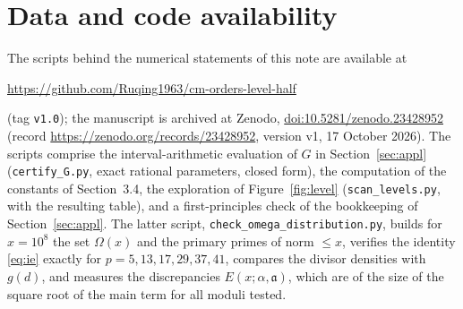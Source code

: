 \documentclass[11pt]{amsart}
\theoremstyle{remark}
\newcommand{\fa}{\mathfrak{a}}
\newcommand{\Om}{\Omega}
\begin{document}
\section*{Data and code availability}
The scripts behind the numerical statements of this note are available at
\begin{center}
\url{https://github.com/Ruqing1963/cm-orders-level-half}
\end{center}
(tag \texttt{v1.0}); the manuscript is archived at Zenodo, \href{https://doi.org/10.5281/zenodo.23428952}{doi:10.5281/zenodo.23428952} (record \url{https://zenodo.org/records/23428952}, version v1, 17 October 2026). The scripts comprise
the interval-arithmetic evaluation of $G$ in Section~\ref{sec:appl} (\texttt{certify\_G.py}, exact rational parameters, closed form), the computation of the constants of Section~3.4, the exploration of Figure~\ref{fig:level} (\texttt{scan\_levels.py}, with the resulting table), and a first-principles check of the bookkeeping of Section~\ref{sec:appl}. The latter script, \texttt{check\_omega\_distribution.py}, builds for $x=10^8$ the set $\Om(x)$ and the primary primes of norm $\le x$, verifies the identity \eqref{eq:ie} exactly for $p=5,13,17,29,37,41$, compares the divisor densities with $g(d)$, and measures the discrepancies $E(x;\alpha,\fa)$, which are of the size of the square root of the main term for all moduli tested.
\end{document}

